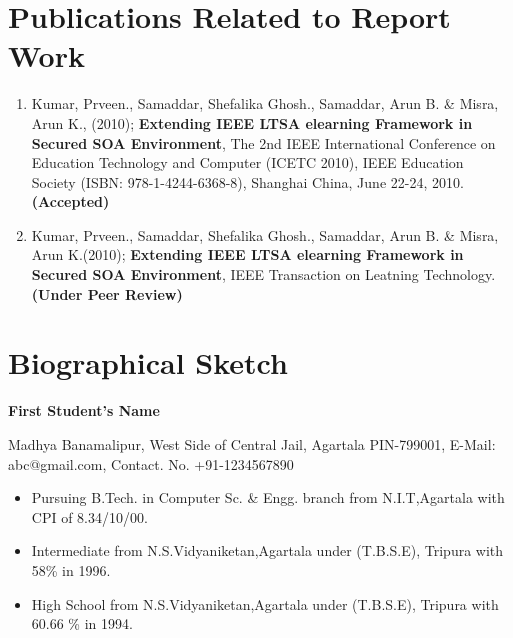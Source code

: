 \documentclass[english,a4paper,babel,12pt]{nitathesis}
\numberwithin{figure}{chapter}
\begin{document}
\appendix 
\renewcommand{\thechapter}{\Roman{chapter}}
\chapter{Publications Related to Report Work}
\begin{enumerate}	
 \item  Kumar, Prveen., Samaddar, Shefalika Ghosh., Samaddar, Arun B. \& Misra, Arun K.,
 (2010); \textbf{Extending IEEE LTSA e­learning Framework in Secured SOA Environment}, 
  The 2nd IEEE International Conference on Education Technology and Computer (ICETC 2010),
 IEEE Education Society (ISBN: 978-1-4244-6368-8), Shanghai China, June 22-­24, 2010. 
\textbf{(Accepted)}
\item   Kumar, Prveen., Samaddar, Shefalika Ghosh., Samaddar, Arun B. \& Misra,
 Arun K.(2010); \textbf{Extending IEEE LTSA e­learning Framework in Secured SOA Environment}, 
  IEEE Transaction on Leatning Technology. \textbf{(Under Peer Review)}
\end{enumerate}

\pagestyle{fancy}
\chapter{Biographical Sketch}
\begin{center}
{\textbf{\LARGE First Student's Name}}\end{center} %
\begin{center}
Madhya Banamalipur, West Side of Central Jail, Agartala  PIN-799001,  E-Mail: abc@gmail.com,  Contact. No. +91-1234567890 \\
 \end{center}
 \begin{itemize}
\item Pursuing B.Tech. in Computer Sc. \& Engg. branch from N.I.T,Agartala with CPI of 8.34/10/00.
\item Intermediate from N.S.Vidyaniketan,Agartala under (T.B.S.E), Tripura with 58\% in 1996.
\item High School from N.S.Vidyaniketan,Agartala under (T.B.S.E), Tripura with 60.66 \% in 1994.
\end{itemize}
\end{document}
